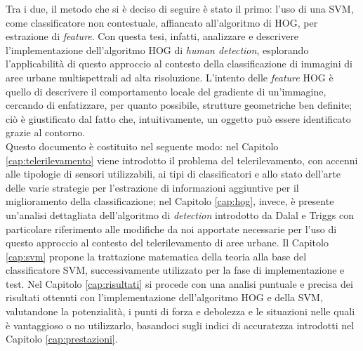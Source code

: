 Tra i due, il metodo che si è deciso di seguire è stato il primo: l'uso di una SVM, come classificatore non contestuale, affiancato all'algoritmo di HOG, per estrazione di \emph{feature}.
Con questa tesi, infatti, analizzare e descrivere l'implementazione dell'algoritmo HOG di \emph{human detection}, esplorando l'applicabilità di questo approccio al contesto della classificazione di immagini di aree urbane multispettrali ad alta risoluzione. L'intento delle \emph{feature} HOG è quello di descrivere il comportamento locale del gradiente di un'immagine, cercando di enfatizzare, per quanto possibile, strutture geometriche ben definite; ciò è giustificato dal fatto che, intuitivamente, un oggetto può essere identificato grazie al contorno.\\

Questo documento è costituito nel seguente modo: nel Capitolo \ref{cap:telerilevamento} viene introdotto il problema del telerilevamento, con accenni alle tipologie di sensori utilizzabili, ai tipi di classificatori e allo stato dell'arte delle varie strategie per l'estrazione di informazioni aggiuntive per il miglioramento della classificazione; nel Capitolo \ref{cap:hog}, invece, è presente un'analisi dettagliata dell'algoritmo di \emph{detection} introdotto da Dalal e Triggs \citep{Art_HOGHuman} con particolare riferimento alle modifiche da noi apportate necessarie per l'uso di questo approccio al contesto del telerilevamento di aree urbane. Il Capitolo \ref{cap:svm} propone la trattazione matematica della teoria alla base del classificatore SVM, successivamente utilizzato per la fase di implementazione e test. 
Nel Capitolo \ref{cap:risultati} si procede con una analisi puntuale e precisa dei risultati ottenuti con l'implementazione dell'algoritmo HOG e della SVM, valutandone la potenzialità, i punti di forza e debolezza e le situazioni nelle quali è vantaggioso o no utilizzarlo, basandoci sugli indici di accuratezza introdotti nel Capitolo \ref{cap:prestazioni}.


